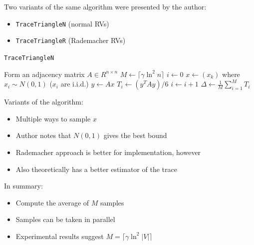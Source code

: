 \documentclass{beamer}
\begin{document}

\begin{frame}
    Two variants of the same algorithm were presented by the author:
    
    \begin{itemize}
        \item \texttt{TraceTriangleN} (normal RVs)
        \item \texttt{TraceTriangleR} (Rademacher RVs)
    \end{itemize}
    
\end{frame}
\begin{frame}[fragile]
    \texttt{TraceTriangleN}
    \begin{algorithm}[H]
        Form an adjacency matrix $A \in R^{n \times n}$\;
        $M \leftarrow \lceil \gamma \ln^2 n \rceil$\;
        $i \leftarrow 0$\;
         {
            $x \leftarrow (x_k)$ where $x_i \sim N(0,1)$ ($x_i$ are i.i.d.)\;
            $y \leftarrow Ax$\;
            $T_i \leftarrow (y^T A y)/6$\;
            $i \leftarrow i + 1$\;
        }
        $\Delta \leftarrow \frac{1}{M} \sum_{i=1}^{M} T_i$\;
    \end{algorithm}
\end{frame}


\begin{frame}
    Variants of the algorithm:
    
    \begin{itemize}
        \item Multiple ways to sample $x$
        \item Author notes that $N(0,1)$ gives the best bound
        \item Rademacher approach is better for implementation, however
        \item Also theoretically has a better estimator of the trace
    \end{itemize}
    
\end{frame}

\begin{frame}
In summary:
    \begin{itemize}
     \item Compute the average of $M$ samples
     \item Samples can be taken in parallel
     \item Experimental results suggest $M = \lceil \gamma \ln^2 |V| \rceil$
    \end{itemize}
\end{frame}
\end{document}
